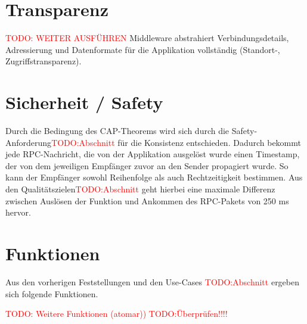 
\section*{Transparenz}
\textcolor{red}{TODO: WEITER AUSFÜHREN}
Middleware abstrahiert Verbindungsdetails, Adressierung und Datenformate für die Applikation vollständig (Standort-, Zugriffstransparenz).

\section*{Sicherheit / Safety}

Durch die Bedingung des CAP-Theorems wird sich durch die Safety-Anforderung\textcolor{red}{TODO:Abschnitt} für die Konsistenz entschieden.
Dadurch bekommt jede RPC-Nachricht, die von der Applikation ausgelöst wurde einen Timestamp, der von dem jeweiligen Empfänger zuvor an den Sender propagiert wurde. So kann der Empfänger sowohl Reihenfolge als auch Rechtzeitigkeit bestimmen. Aus den Qualitätszielen\textcolor{red}{TODO:Abschnitt} geht hierbei eine maximale Differenz zwischen Auslösen der Funktion und Ankommen des RPC-Pakets von 250 ms hervor.
	

\section{Funktionen}
Aus den vorherigen Feststellungen und den Use-Cases \textcolor{red}{TODO:Abschnitt} ergeben sich folgende Funktionen.

\textcolor{red}{TODO: Weitere Funktionen (atomar))}
\textcolor{red}{TODO:Überprüfen!!!!}

